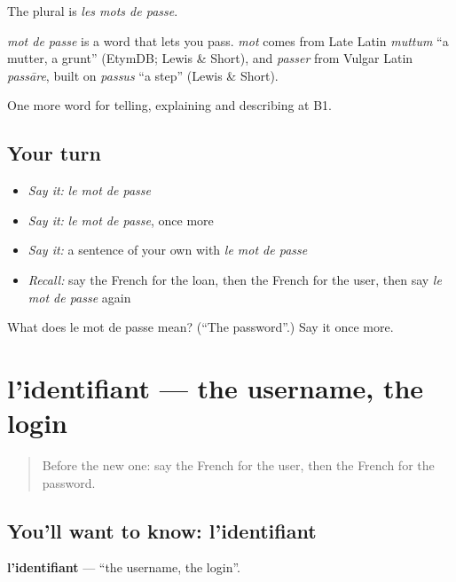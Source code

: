 The plural is \emph{les mots de passe}.

\begin{cousinweb}
\emph{mot de passe} is a word that lets you pass. \emph{mot} comes from Late Latin \emph{muttum} \textquotedblleft{}a mutter, a grunt\textquotedblright{} (EtymDB; Lewis \& Short), and \emph{passer} from Vulgar Latin \emph{passāre}, built on \emph{passus} \textquotedblleft{}a step\textquotedblright{} (Lewis \& Short).
\end{cousinweb}

\begin{grammarlens}[title={What you've built}]
One more word for telling, explaining and describing at B1.
\end{grammarlens}

\subsection*{Your turn}
\begin{itemize}
\raggedright
  \item \emph{Say it:} \emph{le mot de passe}
  \item \emph{Say it:} \emph{le mot de passe}, once more
  \item \emph{Say it:} a sentence of your own with \emph{le mot de passe}
  \item \emph{Recall:} say the French for the loan, then the French for the user, then say \emph{le mot de passe} again
\end{itemize}

\begin{tcolorbox}[breakable,colback=teal!4,colframe=teal!35!black,title={Before you move on}]
What does le mot de passe mean? (\textquotedblleft{}The password\textquotedblright{}.) Say it once more.
\end{tcolorbox}
\section[l'identifiant]{l'identifiant — the username, the login}

\label{lesson:FR-C395-identifiant}



\begin{quote}
Before the new one: say the French for the user, then the French for the password.
\end{quote}

\subsection*{You'll want to know: l'identifiant}
\textbf{l'identifiant} — \textquotedblleft{}the username, the login\textquotedblright{}.

